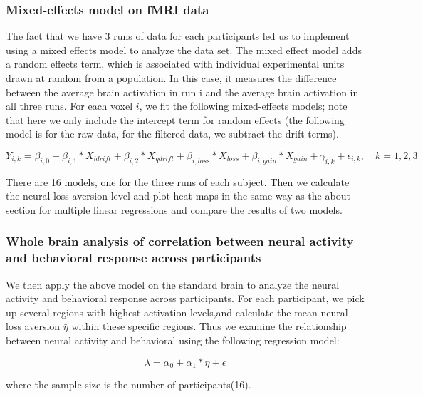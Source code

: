 \documentclass[11pt]{article}
\begin{document}
\subsubsection{Mixed-effects model on fMRI data}

The fact that we have 3 runs of data for each participants led us to implement 
using a mixed effects model to analyze the data set. The mixed effect model adds 
a random effects term, which is associated with individual experimental units 
drawn at random from a population. In this case, it measures the difference 
between the average brain activation in run i and the 
average brain activation in all three runs. For each voxel $i$, we fit the 
following mixed-effects models; note that here we only include the intercept 
term for random effects (the following model is for the raw data, for the 
filtered data, we subtract the drift terms).

\begin{equation}
Y_{i, k} = \beta_{i, 0} + \beta_{i,1} *X_{ldrift} + \beta_{i, 2} * X_{qdrift} 
+  \beta_{i, loss} *X_{loss} + \beta_{i, gain} * X_{gain}  + \gamma _{i, k} 
+ \epsilon_{i, k}, \quad k =1, 2, 3
\end{equation}

There are 16 models, one for the three runs of each subject. Then we calculate 
the neural loss aversion level and plot heat maps in the same 
way as the about section for multiple linear regressions and compare the 
results of two models. 

\subsubsection{Whole brain analysis of correlation between 
neural activity and behavioral response across participants}

We then apply the above model on the standard brain to analyze the neural 
activity and behavioral response across participants. For each participant, 
we pick up several regions with highest activation levels,and calculate the mean 
neural loss aversion $\bar{\eta}$ within these specific regions. Thus we 
examine the relationship between neural activity and behavioral using the 
following regression model:

\begin{equation}
\lambda = \alpha_0 + \alpha_1 * \eta + \epsilon
\end{equation}

where the sample size is the number of participants(16). 
\end{document}
